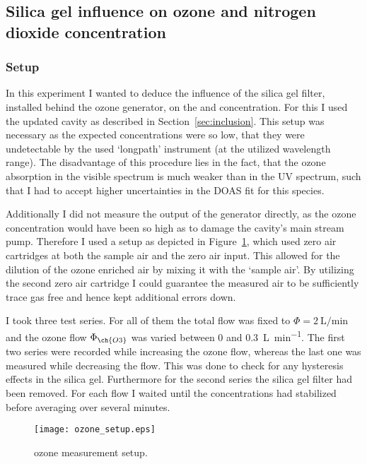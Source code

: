 \subsection{Silica gel influence on ozone and nitrogen dioxide concentration}
\label{sec:silica}

\subsubsection{Setup}
\label{sec:silica-setup}

In this experiment I wanted to deduce the influence of the silica gel
filter, installed behind the ozone generator, on the  and
 concentration. For this I used the updated cavity as described
in Section~\ref{sec:inclusion}. This setup was necessary as the
expected  concentrations were so low, that they were
undetectable by the used `longpath' instrument (at the utilized
wavelength range). The disadvantage of this procedure lies in the
fact, that the ozone absorption in the visible spectrum is much weaker
than in the UV spectrum, such that I had to accept higher
uncertainties in the DOAS fit for this species.

Additionally I did not measure the output of the generator directly,
as the ozone concentration would have been so high as to damage the
cavity's main stream pump. Therefore I used a setup as depicted in
Figure~\ref{fig:ozone-flow-setup}, which used zero air cartridges at
both the sample air and the zero air input. This allowed for the
dilution of the ozone enriched air by mixing it with the `sample
air'. By utilizing the second zero air cartridge I could guarantee the
measured air to be sufficiently trace gas free and hence kept
additional errors down.

I took three test series. For all of them the total flow was fixed to
$\Phi = \SI{2}{\liter\per\minute}$ and the ozone flow $\Phi_{\ch{O3}}$
was varied between \num{0} and \SI{0.3}{\liter\per\minute}. The first
two series were recorded while increasing the ozone flow, whereas the
last one was measured while decreasing the flow. This was done to
check for any hysteresis effects in the silica gel. Furthermore for
the second series the silica gel filter had been removed. For each
flow I waited until the concentrations had stabilized before
averaging over several minutes.

\begin{figure}[htbp]
  \centering
  \texttt{[image: ozone\_setup.eps]}
  \caption{ozone measurement setup.}
  \label{fig:ozone-flow-setup}
\end{figure}

